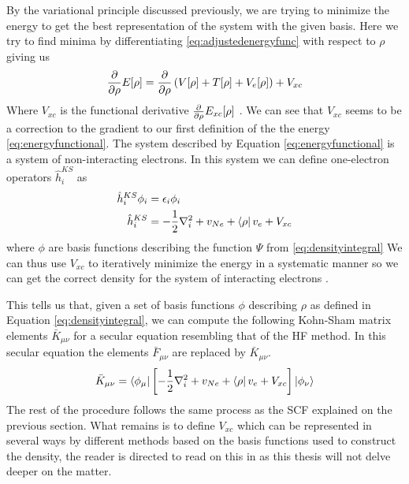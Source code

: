 \documentclass[../master_thesis.tex]{subfiles}
\begin{document}
By the variational principle discussed previously, we are trying to minimize the energy
to get the best representation of the system with the given basis. Here we try to
find minima by differentiating \ref{eq:adjustedenergyfunc} with respect to $\rho$ giving us
\begin{align}\label{eq:energyderiv}
   \frac{\partial}{\partial \rho}E[\rho] = \frac{\partial}{\partial \rho}\left( V[\rho] + T[\rho] + V_{e}[\rho]\right) + V_{xc}
\end{align}
Where $V_{xc}$ is the functional derivative $\frac{\partial}{\partial \rho}E_{xc}[\rho]$ \cite{Cramer:2004}.
We can see that $V_{xc}$ seems to be a correction to the gradient to our first definition
of the the energy \ref{eq:energyfunctional}. The system described by Equation
\ref{eq:energyfunctional} is a system of non-interacting electrons. In this
system we can define one-electron operators $\hat{h}_i^{KS}$ as
\begin{align}
  \hat{h}_i^{KS} \phi_i &= \epsilon_i \phi_i \\
  \hat{h}_i^{KS} &= - \frac{1}{2}\nabla^2_i + v_{Ne} + \bra{\rho}v_e + V_{xc}
\end{align}
where $\phi$ are basis functions describing the function $\Psi$ from \ref{eq:densityintegral}
We can thus use $V_{xc}$ to iteratively minimize the energy in a systematic manner so we can
get the correct density for the system of interacting electrons \cite{Cramer:2004}.

This tells us that, given a set of basis functions $\phi$ describing
$\rho$ as defined in Equation \ref{eq:densityintegral}, we can compute the following
Kohn-Sham  matrix elements $\bar{K}_{\mu\nu}$ for a secular equation resembling that of the \ac{HF}
method. In this secular equation the elements $\bar{F}_{\mu\nu}$ are replaced by $\bar{K}_{\mu\nu}$.
\begin{equation}
  \bar{K}_{\mu\nu} = \braket{\phi_\mu|\left[- \frac{1}{2}\nabla^2_i + v_{Ne} + \bra{\rho}v_e + V_{xc}\right]|\phi_\nu}
\end{equation}
The rest of the procedure follows the same process as the \ac{SCF} explained on
the previous section.
What remains is to define $V_{xc}$ which can be represented in several ways by different methods
based on the basis functions used to construct the density, the reader is directed to
read on this in \cite{Cramer:2004} as this thesis will not delve deeper on the
matter.


\biblio
\end{document}
